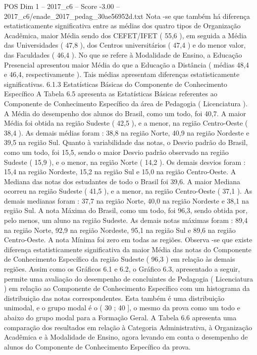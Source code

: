 \begin{textsample}{POS Dim 1 – 2017\_c6 – Score -3.00 – 2017\_c6/enade\_2017\_pedag\_30ae56952d.txt}
Nota -se que também há diferença estatisticamente significativa entre as médias dos quatro tipos de Organização Acadêmica, maior Média sendo dos CEFET/IFET ( 55,6 ), em seguida a Média das Universidades ( 47,8 ), dos Centros universitários ( 47,4 ) e do menor valor, das Faculdades ( 46,4 ).
No que se refere à Modalidade de Ensino, a Educação Presencial apresentou maior Média do que a Educação a Distância ( médias 48,4 e 46,4, respectivamente ).
Tais médias apresentam diferenças estatisticamente significativas. 6.1.3 Estatísticas Básicas do Componente de Conhecimento Específico A Tabela 6.5 apresenta as Estatísticas Básicas referentes ao Componente de Conhecimento Específico da área de Pedagogia ( Licenciatura ).
A Média do desempenho dos alunos do Brasil, como um todo, foi 40,7.
A maior Média foi obtida na região Sudeste ( 42,5 ), e a menor, na região Centro-Oeste ( 38,4 ).
As demais médias foram : 38,8 na região Norte, 40,9 na região Nordeste e 39,5 na região Sul.
Quanto à variabilidade das notas, o Desvio padrão do Brasil, como um todo, foi 15,5, sendo o maior Desvio padrão observado na região Sudeste ( 15,9 ), e o menor, na região Norte ( 14,2 ).
Os demais desvios foram : 15,4 na região Nordeste, 15,2 na região Sul e 15,0 na região Centro-Oeste.
A Mediana das notas dos estudantes de todo o Brasil foi 39,6.
A maior Mediana ocorreu na região Sudeste ( 41,5 ), e a menor, na região Centro-Oeste ( 37,1 ).
As demais medianas foram : 37,7 na região Norte, 40,0 na região Nordeste e 38,1 na região Sul.
A nota Máxima do Brasil, como um todo, foi 96,3, sendo obtida por, pelo menos, um aluno na região Sudeste.
As demais notas máximas foram : 89,4 na região Norte, 92,9 na região Nordeste, 95,1 na região Sul e 89,6 na região Centro-Oeste.
A nota Mínima foi zero em todas as regiões.
Observa -se que existe diferença estatisticamente significativa da maior Média das notas do Componente de Conhecimento Específico da região Sudeste ( 96,3 ) em relação às demais regiões.
Assim como os Gráficos 6.1 e 6.2, o Gráfico 6.3, apresentado a seguir, permite uma avaliação do desempenho de concluintes de Pedagogia ( Licenciatura ) em relação ao Componente de Conhecimento Específico com um histograma da distribuição das notas correspondentes.
Esta também é uma distribuição unimodal, e o grupo modal é o ( 30 ; 40 ], o mesmo da prova como um todo e abaixo do grupo modal para a Formação Geral.
A Tabela 6.6 apresenta uma comparação dos resultados em relação à Categoria Administrativa, à Organização Acadêmica e à Modalidade de Ensino, agora levando em conta o desempenho de alunos do Componente de Conhecimento Específico da prova.

\end{textsample}
